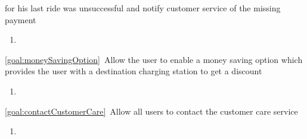 \begin{description}
  		for his last ride was unsuccessful and notify customer service of the missing
  		payment
  			\begin{enumerate}[resume*]
  				\item
  			\end{enumerate}
  		\item \ref{goal:moneySavingOption}\ Allow the user to enable a money saving option which
  		provides the user with a destination charging station to get a discount
  			\begin{enumerate}[resume*]
  				\item
   			\end{enumerate}
  		\item \ref{goal:contactCustomerCare}\ Allow all users to contact the customer care service
  			\begin{enumerate}[resume*]
  				\item
   			\end{enumerate}
  	\end{description}

